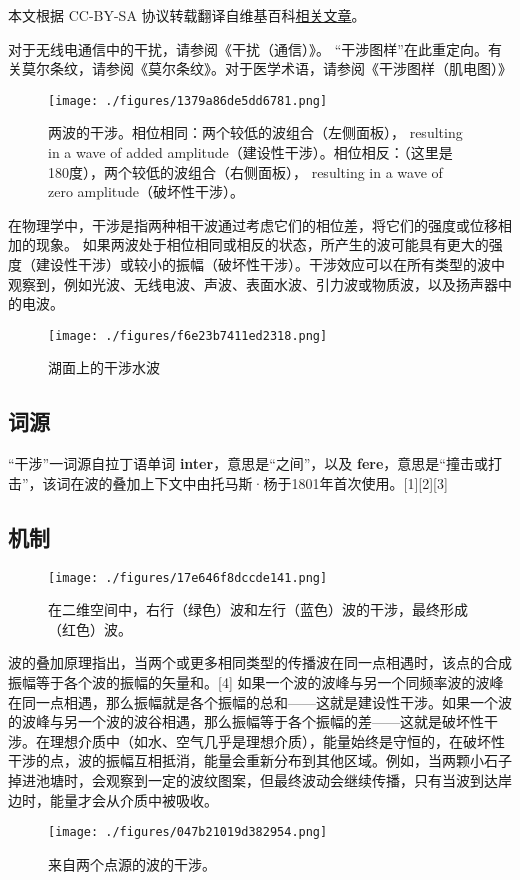 
本文根据 CC-BY-SA 协议转载翻译自维基百科\href{https://en.wikipedia.org/wiki/Wave_interference}{相关文章}。

对于无线电通信中的干扰，请参阅《干扰（通信）》。
“干涉图样”在此重定向。有关莫尔条纹，请参阅《莫尔条纹》。对于医学术语，请参阅《干涉图样（肌电图）》
\begin{figure}[ht]
\centering
\texttt{[image: ./figures/1379a86de5dd6781.png]}
\caption{两波的干涉。相位相同：两个较低的波组合（左侧面板）， resulting in a wave of added amplitude（建设性干涉）。相位相反：（这里是180度），两个较低的波组合（右侧面板）， resulting in a wave of zero amplitude（破坏性干涉）。} \label{fig_GSWLX_1}
\end{figure}
在物理学中，干涉是指两种相干波通过考虑它们的相位差，将它们的强度或位移相加的现象。 如果两波处于相位相同或相反的状态，所产生的波可能具有更大的强度（建设性干涉）或较小的振幅（破坏性干涉）。干涉效应可以在所有类型的波中观察到，例如光波、无线电波、声波、表面水波、引力波或物质波，以及扬声器中的电波。
\begin{figure}[ht]
\centering
\texttt{[image: ./figures/f6e23b7411ed2318.png]}
\caption{湖面上的干涉水波} \label{fig_GSWLX_2}
\end{figure}
\subsection{词源}  
“干涉”一词源自拉丁语单词 \textbf{inter}，意思是“之间”，以及 \textbf{fere}，意思是“撞击或打击”，该词在波的叠加上下文中由托马斯·杨于1801年首次使用。[1][2][3]
\subsection{机制}
\begin{figure}[ht]
\centering
\texttt{[image: ./figures/17e646f8dccde141.png]}
\caption{在二维空间中，右行（绿色）波和左行（蓝色）波的干涉，最终形成（红色）波。} \label{fig_GSWLX_3}
\end{figure}
波的叠加原理指出，当两个或更多相同类型的传播波在同一点相遇时，该点的合成振幅等于各个波的振幅的矢量和。[4] 如果一个波的波峰与另一个同频率波的波峰在同一点相遇，那么振幅就是各个振幅的总和——这就是建设性干涉。如果一个波的波峰与另一个波的波谷相遇，那么振幅等于各个振幅的差——这就是破坏性干涉。在理想介质中（如水、空气几乎是理想介质），能量始终是守恒的，在破坏性干涉的点，波的振幅互相抵消，能量会重新分布到其他区域。例如，当两颗小石子掉进池塘时，会观察到一定的波纹图案，但最终波动会继续传播，只有当波到达岸边时，能量才会从介质中被吸收。
\begin{figure}[ht]
\centering
\texttt{[image: ./figures/047b21019d382954.png]}
\caption{来自两个点源的波的干涉。} \label{fig_GSWLX_4}
\end{figure}